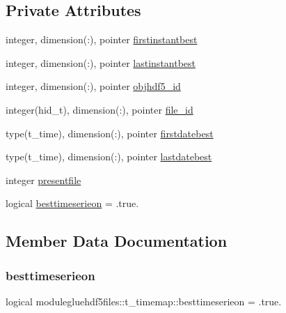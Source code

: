\subsection*{Private Attributes}
\begin{DoxyCompactItemize}
\item 
integer, dimension(\+:), pointer \mbox{\hyperlink{structmodulegluehdf5files_1_1t__timemap_a7d808469bca7a5373488b5d41fa5222c}{firstinstantbest}}
\item 
integer, dimension(\+:), pointer \mbox{\hyperlink{structmodulegluehdf5files_1_1t__timemap_afd590c02dcf5e109658a97df4bc74fb7}{lastinstantbest}}
\item 
integer, dimension(\+:), pointer \mbox{\hyperlink{structmodulegluehdf5files_1_1t__timemap_adc2cfad2e6b50071382dc5ad6efdcf4b}{objhdf5\+\_\+id}}
\item 
integer(hid\+\_\+t), dimension(\+:), pointer \mbox{\hyperlink{structmodulegluehdf5files_1_1t__timemap_ac9f32a250afca54fec09908cb7a219ad}{file\+\_\+id}}
\item 
type(t\+\_\+time), dimension(\+:), pointer \mbox{\hyperlink{structmodulegluehdf5files_1_1t__timemap_ae27ee27a4d2a45951737647938d280d3}{firstdatebest}}
\item 
type(t\+\_\+time), dimension(\+:), pointer \mbox{\hyperlink{structmodulegluehdf5files_1_1t__timemap_a5f0d5cb8df26c03a2590b6444472a396}{lastdatebest}}
\item 
integer \mbox{\hyperlink{structmodulegluehdf5files_1_1t__timemap_a4656aa2b11dd4b32ff69729db07ea415}{presentfile}}
\item 
logical \mbox{\hyperlink{structmodulegluehdf5files_1_1t__timemap_aa3d6269a425d3941a372c74e330ad02d}{besttimeserieon}} = .true.
\end{DoxyCompactItemize}


\subsection{Member Data Documentation}
\mbox{\label{structmodulegluehdf5files_1_1t__timemap_aa3d6269a425d3941a372c74e330ad02d}} 
\subsubsection{\texorpdfstring{besttimeserieon}{besttimeserieon}}
{\footnotesize\ttfamily logical modulegluehdf5files\+::t\+\_\+timemap\+::besttimeserieon = .true.\hspace{0.3cm}{\ttfamily [private]}}

